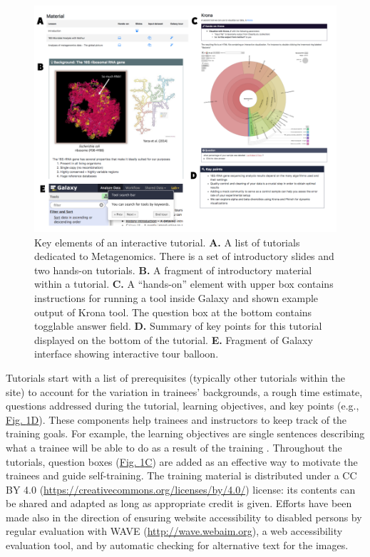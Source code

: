 \begin{figure}[t!]
    \centering
    \includegraphics[width=\textwidth]{chapters/images/training/training-figure-metagenomics.png}
    \caption{ Key elements of an interactive tutorial. \textbf{A.} A list of tutorials dedicated to Metagenomics. There is a set of introductory slides and two hands-on tutorials. \textbf{B.} A fragment of introductory material within a tutorial. \textbf{C.} A “hands-on” element with upper box contains instructions for running a tool inside Galaxy and shown example output of Krona tool. The question box at the bottom contains togglable answer field. \textbf{D.} Summary of key points for this tutorial displayed on the bottom of the tutorial. \textbf{E.} Fragment of Galaxy interface showing interactive tour balloon.  }
    \label{fig:metagenomics}
\end{figure}

Tutorials start with a list of prerequisites (typically other tutorials within the site) to account for the variation in trainees’ backgrounds, a rough time estimate, questions addressed during the tutorial, learning objectives, and key points (e.g., \hyperref[fig:metagenomics]{Fig. \ref{fig:metagenomics}D}). These components help trainees and instructors to keep track of the training goals. For example, the learning objectives are single sentences describing what a trainee will be able to do as a result of the training \cite{via2013best}. Throughout the tutorials, question boxes (\hyperref[fig:metagenomics]{Fig. \ref{fig:metagenomics}C}) are added as an effective way to motivate the trainees \cite{dollar2007enhancing} \cite{scheines2005replacing} and guide self-training. The training material is distributed under a CC BY 4.0 (\url{https://creativecommons.org/licenses/by/4.0/}) license: its contents can be shared and adapted as long as appropriate credit is given. Efforts have been made also in the direction of ensuring website accessibility to disabled persons by regular evaluation with WAVE (\url{http://wave.webaim.org}), a web accessibility evaluation tool, and by automatic checking for alternative text for the images.

